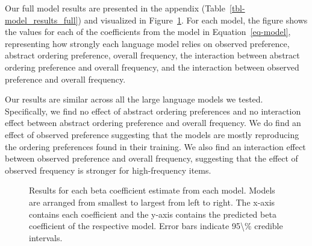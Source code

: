 \documentclass[
  12pt,
  letterpaper,
]{scrreport}
\begin{document}
Our full model results are presented in the appendix
(Table~\ref{tbl-model_results_full}) and visualized in
Figure~\ref{fig-results}. For each model, the figure shows the values
for each of the coefficients from the model in Equation~\ref{eq-model},
representing how strongly each language model relies on observed
preference, abstract ordering preference, overall frequency, the
interaction between abstract ordering preference and overall frequency,
and the interaction between observed preference and overall frequency.

Our results are similar across all the large language models we tested.
Specifically, we find no effect of abstract ordering preferences and no
interaction effect between abstract ordering preference and overall
frequency. We do find an effect of observed preference suggesting that
the models are mostly reproducing the ordering preferences found in
their training. We also find an interaction effect between observed
preference and overall frequency, suggesting that the effect of observed
frequency is stronger for high-frequency items.

\begin{figure}[htbp]

\caption{\label{fig-results}Results for each beta coefficient estimate
from each model. Models are arranged from smallest to largest from left
to right. The x-axis contains each coefficient and the y-axis contains
the predicted beta coefficient of the respective model. Error bars
indicate 95\textbackslash\% credible intervals.}


\end{figure}%
\end{document}
